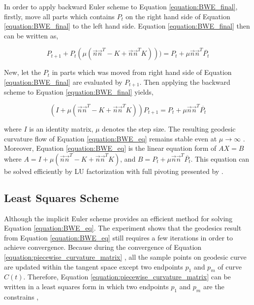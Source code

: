 In order to apply backward Euler scheme to Equation \ref{equation:BWE_final}, firstly, move all parts which contains $P_{t}$ on the right hand side of Equation \ref{equation:BWE_final} to the left hand side. Equation \ref{equation:BWE_final} then can be written as,

\begin{equation}
P_{t+1} + P_{t}(\mu(\vec{n}\vec{n}^{T}-K+\vec{n}\vec{n}^{T}K))) = P_t + \mu\vec{n}\vec{n}^{T}\overline{P_{t}}
\label{equation:BWE_procedure1}
\end{equation}

New, let the $P_{t}$ in parts which was moved from right hand side of Equation \ref{equation:BWE_final} are evaluated by $P_{t+1}$. Then applying the backward scheme to Equation \ref{equation:BWE_final} yields,

\begin{equation}
(I + \mu(\vec{n}\vec{n}^{T}-K+\vec{n}\vec{n}^{T}K))P_{t+1} = P_t + \mu\vec{n}\vec{n}^{T}\overline{P_{t}}
\label{equation:BWE_eq}
\end{equation}

where $I$ is an identity matrix, $\mu$ denotes the step size. The resulting geodesic curvature flow of Equation \ref{equation:BWE_eq} remains stable even at $\mu \rightarrow\infty$ . Moreover, Equation \ref{equation:BWE_eq} is the linear equation form of $AX = B$ where $A =  I + \mu(\vec{n}\vec{n}^{T}-K+\vec{n}\vec{n}^{T}K)$, and  $B = P_t + \mu\vec{n}\vec{n}^{T}\overline{P_{t}}$. This equation can be solved efficiently by LU factorization with full pivoting presented by \cite{trefethen1997numerical}. 

\subsection{Least Squares Scheme}

Although the implicit Euler scheme provides an efficient method for solving Equation \ref{equation:BWE_eq}. The experiment shows that the geodesics result from Equation \ref{equation:BWE_eq} still requires a few iterations in order to achieve convergence. Because during the convergence of Equation \ref{equation:piecewise_curvature_matrix} , all the sample points on geodesic curve are updated within the tangent space except two endpoints $p_{1}$ and $p_{m}$ of curve $C(t)$. Therefore, Equation \ref{equation:piecewise_curvature_matrix} can be written in a least squares form in which two endpoints $p_{1}$ and $p_{m}$ are the constrains ,  

